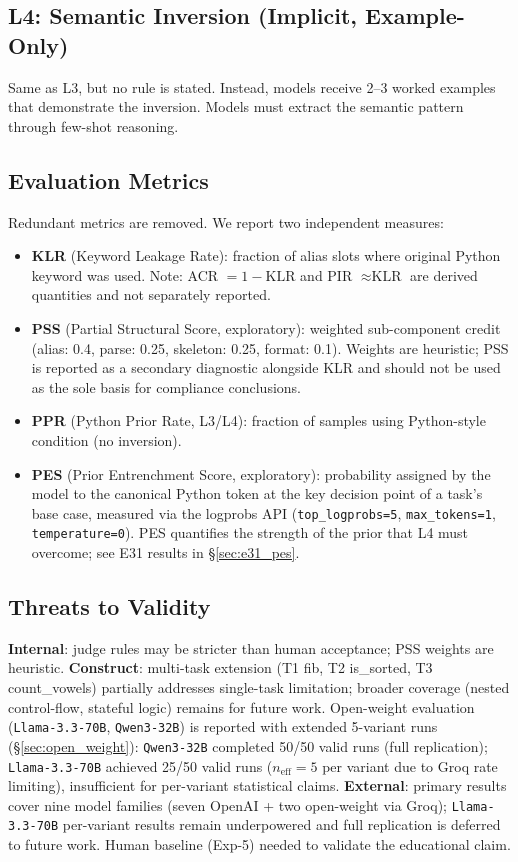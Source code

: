 \subsection{L4: Semantic Inversion (Implicit, Example-Only)}
Same as L3, but no rule is stated. Instead, models receive 2--3 worked examples that demonstrate the inversion. Models must extract the semantic pattern through few-shot reasoning.

\subsection{Evaluation Metrics}
Redundant metrics are removed. We report two independent measures:
\begin{itemize}
  \item \textbf{KLR} (Keyword Leakage Rate): fraction of alias slots where original Python keyword was used. Note: ACR $= 1 - \text{KLR}$ and PIR $\approx \text{KLR}$ are derived quantities and not separately reported.
  \item \textbf{PSS} (Partial Structural Score, exploratory): weighted sub-component credit (alias: 0.4, parse: 0.25, skeleton: 0.25, format: 0.1). Weights are heuristic; PSS is reported as a secondary diagnostic alongside KLR and should not be used as the sole basis for compliance conclusions.
  \item \textbf{PPR} (Python Prior Rate, L3/L4): fraction of samples using Python-style condition (no inversion).
  \item \textbf{PES} (Prior Entrenchment Score, exploratory): probability assigned by the model to the canonical Python token at the key decision point of a task's base case, measured via the logprobs API (\texttt{top\_logprobs=5}, \texttt{max\_tokens=1}, \texttt{temperature=0}). PES quantifies the strength of the prior that L4 must overcome; see E31 results in \S\ref{sec:e31_pes}.
\end{itemize}

\subsection{Threats to Validity}
\textbf{Internal}: judge rules may be stricter than human acceptance; PSS weights are heuristic.
\textbf{Construct}: multi-task extension (T1 fib, T2 is\_sorted, T3 count\_vowels) partially addresses single-task limitation; broader coverage (nested control-flow, stateful logic) remains for future work. Open-weight evaluation (\texttt{Llama-3.3-70B}, \texttt{Qwen3-32B}) is reported with extended 5-variant runs (§\ref{sec:open_weight}): \texttt{Qwen3-32B} completed 50/50 valid runs (full replication); \texttt{Llama-3.3-70B} achieved 25/50 valid runs ($n_\mathrm{eff}=5$ per variant due to Groq rate limiting), insufficient for per-variant statistical claims.
\textbf{External}: primary results cover nine model families (seven OpenAI + two open-weight via Groq); \texttt{Llama-3.3-70B} per-variant results remain underpowered and full replication is deferred to future work. Human baseline (Exp-5) needed to validate the educational claim.
